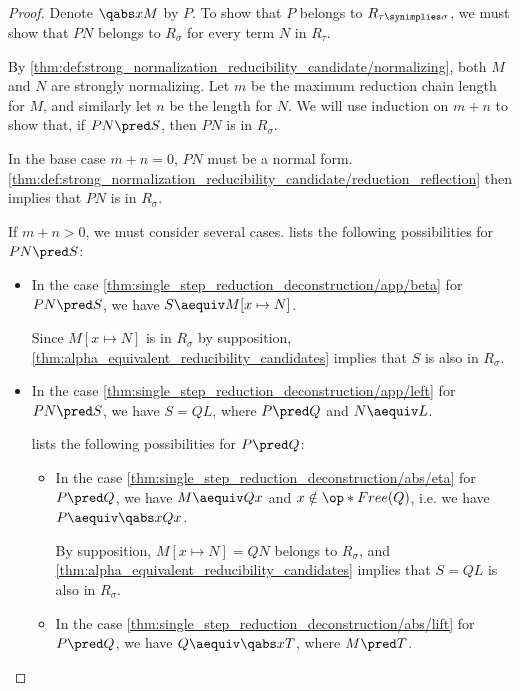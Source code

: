 \begin{proof}
  Denote \( \qabs x M \) by \( P \). To show that \( P \) belongs to \( R_{\tau \synimplies \sigma} \), we must show that \( P N \) belongs to \( R_\sigma \) for every term \( N \) in \( R_\tau \).

  By \ref{thm:def:strong_normalization_reducibility_candidate/normalizing}, both \( M \) and \( N \) are strongly normalizing. Let \( m \) be the maximum reduction chain length for \( M \), and similarly let \( n \) be the length for \( N \). We will use induction on \( m + n \) to show that, if \( P N \pred S \), then \( P N \) is in \( R_\sigma \).

  In the base case \( m + n = 0 \), \( P N \) must be a normal form. \ref{thm:def:strong_normalization_reducibility_candidate/reduction_reflection} then implies that \( P N \) is in \( R_\sigma \).

  If \( m + n > 0 \), we must consider several cases.  lists the following possibilities for \( P N \pred S \):
  \begin{itemize}
    \item In the case \cref{thm:single_step_reduction_deconstruction/app/beta} for \( P N \pred S \), we have \( S \aequiv M[x \mapsto N] \).

    Since \( M[x \mapsto N] \) is in \( R_\sigma \) by supposition, \cref{thm:alpha_equivalent_reducibility_candidates} implies that \( S \) is also in \( R_\sigma \).

    \item In the case \cref{thm:single_step_reduction_deconstruction/app/left} for \( P N \pred S \), we have \( S = Q L \), where \( P \pred Q \) and \( N \aequiv L \).

     lists the following possibilities for \( P \pred Q \):
    \begin{itemize}
      \item In the case \cref{thm:single_step_reduction_deconstruction/abs/eta} for \( P \pred Q \), we have \( M \aequiv Qx \) and \( x \notin \op*{Free}(Q) \), i.e. we have \( P \aequiv \qabs x Qx \).

      By supposition, \( M[x \mapsto N] = QN \) belongs to \( R_\sigma \), and \cref{thm:alpha_equivalent_reducibility_candidates} implies that \( S = Q L \) is also in \( R_\sigma \).

      \item In the case \cref{thm:single_step_reduction_deconstruction/abs/lift} for \( P \pred Q \), we have \( Q \aequiv \qabs x T \), where \( M \pred T \).


\end{itemize}
\end{itemize}
\end{proof}
